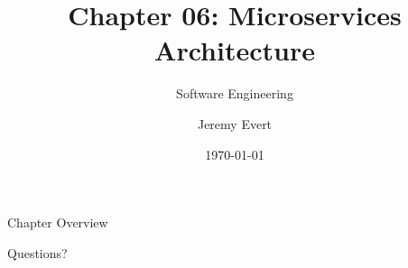\documentclass{beamer}
\title{Chapter 06: Microservices Architecture}
\subtitle{Software Engineering}
\author{Jeremy Evert}
\institute{SWOSU}
\date{\today}
\begin{document}
\begin{frame}
    \titlepage
\end{frame}

\begin{frame}{Chapter Overview}
    \tableofcontents
\end{frame}








\begin{frame}
    \centering
    \Huge Questions?
\end{frame}
\end{document}
